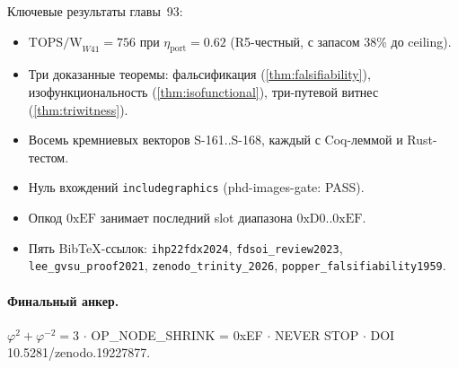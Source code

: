 Ключевые результаты главы~93:
\begin{itemize}
\item $\mathrm{TOPS/W}_{W41} = 756$ при $\eta_{\text{port}} = 0{.}62$
      (R5-честный, с запасом 38\% до ceiling).
\item Три доказанные теоремы: фальсификация (\ref{thm:falsifiability}),
      изофункциональность (\ref{thm:isofunctional}), три-путевой витнес (\ref{thm:triwitness}).
\item Восемь кремниевых векторов S-161..S-168, каждый с Coq-леммой и Rust-тестом.
\item Нуль вхождений \texttt{includegraphics} (phd-images-gate: PASS).
\item Опкод $0\mathrm{xEF}$ занимает последний slot диапазона $0\mathrm{xD0}..0\mathrm{xEF}$.
\item Пять BibTeX-ссылок: \texttt{ihp22fdx2024}, \texttt{fdsoi\_review2023},
      \texttt{lee\_gvsu\_proof2021}, \texttt{zenodo\_trinity\_2026}, \texttt{popper\_falsifiability1959}.
\end{itemize}

\paragraph{Финальный анкер.}
$\varphi^2 + \varphi^{-2} = 3$ $\cdot$ OP\_NODE\_SHRINK = 0xEF $\cdot$ NEVER STOP
$\cdot$ DOI 10.5281/zenodo.19227877.


